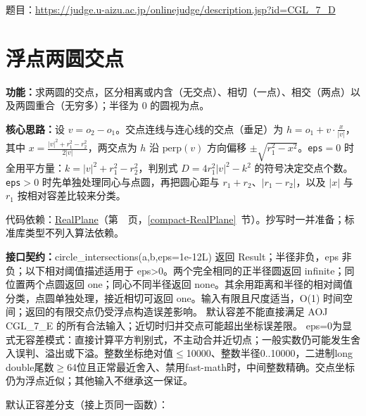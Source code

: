 题目：\url{https://judge.u-aizu.ac.jp/onlinejudge/description.jsp?id=CGL_7_D}



\newpage

\section{浮点两圆交点}\label{compact-circle_intersections}

\noindent\textbf{功能：}\allowbreak 求两圆的交点，区分相离或内含（无交点）、相切（一点）、相交（两点）以及两圆重合（无穷多）；半径为 0 的圆视为点。

\textbf{核心思路：}\allowbreak 设 $v=o_2-o_1$。交点连线与连心线的交点（垂足）为 $h=o_1+v\cdot\frac{x}{|v|}$，其中 $x=\frac{|v|^2+r_1^2-r_2^2}{2|v|}$，两交点为 $h$ 沿 $\mathrm{perp}(v)$ 方向偏移 $\pm\sqrt{r_1^2-x^2}$。\texttt{eps}$=0$ 时全用平方量：$k=|v|^2+r_1^2-r_2^2$，判别式 $D=4r_1^2|v|^2-k^2$ 的符号决定交点个数。\texttt{eps}$>0$ 时先单独处理同心与点圆，再把圆心距与 $r_1+r_2$、$|r_1-r_2|$，以及 $|x|$ 与 $r_1$ 按相对容差比较来分类。

代码依赖：\hyperref[compact-RealPlane]{RealPlane}（第~\pageref{compact-RealPlane}~页，\ref{compact-RealPlane}~节）。抄写时一并准备；标准库类型不列入算法依赖。

{\sloppy{}\noindent\textbf{接口契约：}circle\_intersections(a,b,eps=1e-12L) 返回 Result；半径非负，eps 非负；以下相对阈值描述适用于 eps>0。两个完全相同的正半径圆返回 infinite；同位置两个点圆返回 one；同心不同半径返回 none。其余用距离和半径的相对阈值分类，点圆单独处理，接近相切可返回 one。输入有限且尺度适当，O(1) 时间空间；返回的有限交点仍受浮点构造误差影响。 默认容差不能直接满足 AOJ CGL\_7\_E 的所有合法输入；近切时归并交点可能超出坐标误差限。 eps=0为显式无容差模式：直接计算平方判别式，不主动合并近切点；一般实数仍可能发生舍入误判、溢出或下溢。整数坐标绝对值$\le$10000、整数半径0..10000，二进制long double尾数$\ge$64位且正常最近舍入、禁用fast-math时，中间整数精确。交点坐标仍为浮点近似；其他输入不继承这一保证。\par}

\Needspace{387pt}



\newpage

\noindent 默认正容差分支（接上页同一函数）：



